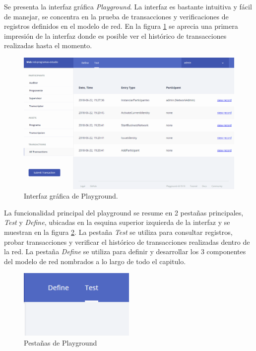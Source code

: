 Se presenta la interfaz gráfica \textit{Playground}. La interfaz es bastante intuitiva y fácil de manejar, se concentra en la prueba de transacciones y verificaciones de registros definidos en el modelo de red. En la figura \ref{fig: playground-presentation} se aprecia una primera impresión de la interfaz donde es posible ver el histórico de transacciones realizadas hasta el momento.

\begin{figure}[H]
\centering
\includegraphics[width=1\textwidth]{playground1.png}
\caption[Interface Playground]{Interfaz gráfica  de Playground.}
\label{fig: playground-presentation}
\end{figure}

La funcionalidad principal del playground se resume en 2 pestañas principales, \textit{Test} y \textit{Define}, ubicadas en la esquina superior izquierda de la interfaz y se muestran en la figura \ref{fig: playground-tabs}. La pestaña \textit{Test} se utiliza para consultar registros, probar transacciones y verificar el  histórico de transacciones realizadas dentro de la red. La pestaña \textit{Define} se utiliza para definir y desarrollar los 3 componentes del modelo de red nombrados a lo largo de todo el capitulo.

\begin{figure}[h]
\centering
\includegraphics[width=0.5\textwidth]{playground7.png}
\caption[Tabs Playground]{Pestañas de Playground }
\label{fig: playground-tabs}
\end{figure}

